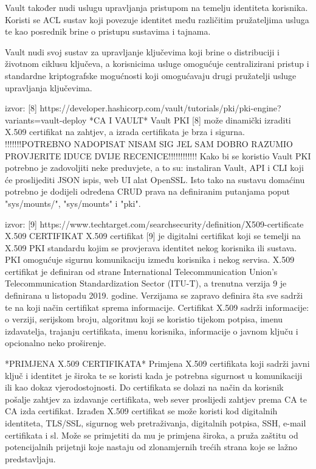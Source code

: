 \documentclass[]{foi}
\begin{document}
Vault također nudi uslugu upravljanja pristupom na temelju identiteta korisnika. 
Koristi se ACL sustav koji povezuje identitet među različitim pružateljima usluga te kao posrednik brine o pristupu sustavima i tajnama.

Vault nudi svoj sustav za upravljanje ključevima koji brine o distribuciji i životnom ciklusu ključeva, a korisnicima usluge omogućuje centralizirani pristup i standardne kriptografske mogućnosti koji omogućavaju drugi pružatelji usluge upravljanja ključevima.

izvor: [8] https://developer.hashicorp.com/vault/tutorials/pki/pki-engine?variants=vault-deploy%
*CA I VAULT*
Vault PKI [8] može dinamički izraditi X.509 certifikat na zahtjev, a izrada certifikata je brza i sigurna.
!!!!!!!POTREBNO NADOPISAT NISAM SIG JEL SAM DOBRO RAZUMIO PROVJERITE IDUCE DVIJE RECENICE!!!!!!!!!!!!
Kako bi se koristio Vault PKI potrebno je zadovoljiti neke preduvjete, a to su: instaliran Vault, API i CLI koji će proslijediti JSON ispis, web UI alat OpenSSL.
Isto tako na sustavu domaćinu potrebno je dodijeli određena CRUD prava na definiranim putanjama poput "sys/mounts/", "sys/mounts" i "pki".

izvor: [9] https://www.techtarget.com/searchsecurity/definition/X509-certificate
X.509 CERTIFIKAT
X.509 certifikat [9] je digitalni certifikat koji se temelji na X.509 PKI standardu kojim se provjerava identitet nekog korisnika ili sustava. 
PKI omogućuje sigurnu komunikaciju između korisnika i nekog servisa.
X.509 certifikat je definiran od strane International Telecommunication Union's Telecommunication Standardization Sector (ITU-T), a trenutna verzija 9 je definirana u listopadu 2019. godine.
Verzijama se zapravo definira šta sve sadrži te na koji način certifikat sprema informacije.
Certifikat X.509 sadrži informacije: o verziji, serijskom broju, algoritmu koji se koristio tijekom potpisa, imenu izdavatelja, trajanju certifikata, imenu korisnika, informacije o javnom ključu i opcionalno neko proširenje.

*PRIMJENA X.509 CERTIFIKATA*
Primjena X.509 certifikata koji sadrži javni ključ i identitet je široka te se koristi kada je potrebna sigurnost u komunikaciji ili kao dokaz vjerodostojnosti.
Do certifikata se dolazi na način da korisnik pošalje zahtjev za izdavanje certifikata, web sever proslijedi zahtjev prema CA te CA izda certifikat. 
Izrađen X.509 certifikat se može koristi kod digitalnih identiteta, TLS/SSL, sigurnog web pretraživanja, digitalnih potpisa, SSH, e-mail certifikata i sl. 
Može se primjetiti da mu je primjena široka, a pruža zaštitu od potencijalnih prijetnji koje nastaju od zlonamjernih trećih strana koje se lažno predstavljaju.
\end{document}
